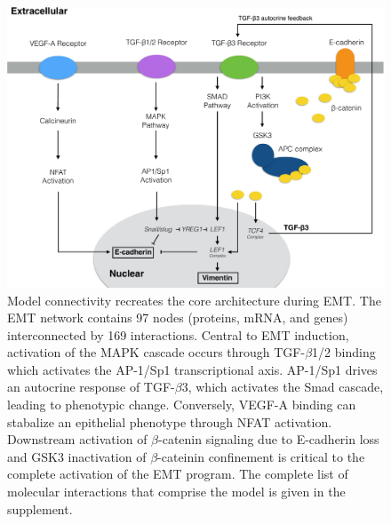 \documentclass[12pt]{article}
\begin{document}
\clearpage
% 
%



\clearpage

\begin{figure}
\includegraphics [width=1.0\linewidth] {./figs/Fig1_coarse_network.pdf}
\caption{Model connectivity recreates the core architecture during EMT. The EMT network contains 97 nodes (proteins, mRNA, and genes) interconnected by 169 interactions.
Central to EMT induction, activation of the MAPK cascade occurs through TGF-$\beta$1/2 binding which activates the AP-1/Sp1 transcriptional axis. AP-1/Sp1 drives an autocrine response of TGF-$\beta$3, which activates the Smad cascade, leading to phenotypic change. Conversely, VEGF-A binding can stabalize an epithelial phenotype through NFAT activation.
Downstream activation of $\beta$-catenin signaling due to E-cadherin loss and GSK3 inactivation of $\beta$-cateinin confinement is critical to the complete activation of the EMT program.
The complete list of molecular interactions that comprise the model is given in the supplement.}\label{fg:F1}
\end{figure}

\clearpage
\end{document}
